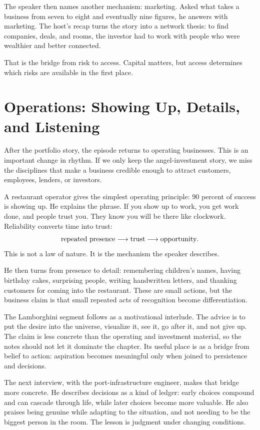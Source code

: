 The speaker then names another mechanism: marketing. Asked what takes a business from seven to eight and eventually nine figures, he answers with marketing. The host's recap turns the story into a network thesis: to find companies, deals, and rooms, the investor had to work with people who were wealthier and better connected.

That is the bridge from risk to access. Capital matters, but access determines which risks are available in the first place.

\section{Operations: Showing Up, Details, and Listening}

After the portfolio story, the episode returns to operating businesses. This is an important change in rhythm. If we only keep the angel-investment story, we miss the disciplines that make a business credible enough to attract customers, employees, lenders, or investors.

A restaurant operator gives the simplest operating principle: 90 percent of success is showing up. He explains the phrase. If you show up to work, you get work done, and people trust you. They know you will be there like clockwork. Reliability converts time into trust:
\begin{equation}
\hbox{repeated presence}
\longrightarrow
\hbox{trust}
\longrightarrow
\hbox{opportunity}.
\end{equation}
This is not a law of nature. It is the mechanism the speaker describes.

He then turns from presence to detail: remembering children's names, having birthday cakes, surprising people, writing handwritten letters, and thanking customers for coming into the restaurant. These are small actions, but the business claim is that small repeated acts of recognition become differentiation.

The Lamborghini segment follows as a motivational interlude. The advice is to put the desire into the universe, visualize it, see it, go after it, and not give up. The claim is less concrete than the operating and investment material, so the notes should not let it dominate the chapter. Its useful place is as a bridge from belief to action: aspiration becomes meaningful only when joined to persistence and decisions.

The next interview, with the port-infrastructure engineer, makes that bridge more concrete. He describes decisions as a kind of ledger: early choices compound and can cascade through life, while later choices become more valuable. He also praises being genuine while adapting to the situation, and not needing to be the biggest person in the room. The lesson is judgment under changing conditions.

